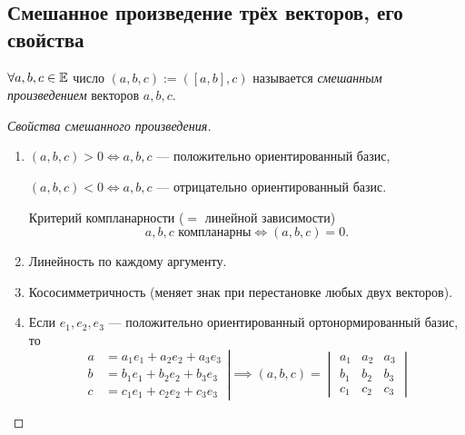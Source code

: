 \subsection{Смешанное произведение трёх векторов, его свойства}

\begin{definition}
    $\forall a, b, c \in \mathbb{E}$ число $(a, b, c) := ([a, b], c)$ называется \textit{смешанным произведением} векторов $a, b, c$.
\end{definition}

\begin{comment}
    Из \hyperref[lec25:t]{теоремы} видно, что $(a, b, c) = \Vol(a, b, c)$.
\end{comment}

\begin{proof}[Свойства смешанного произведения]~
    \begin{enumerate}[nosep]
    \item 
        $(a, b, c) > 0 \iff a, b, c$ --- положительно ориентированный базис,
        
        $(a, b, c) < 0 \iff a, b, c$ --- отрицательно ориентированный базис.

        \medskip
        Критерий компланарности ($= $ линейной зависимости)
        \begin{equation*}
            a, b, c\text{ компланарны} \iff (a, b, c) = 0
        .\end{equation*}

    \item Линейность по каждому аргументу.

    \item Кососимметричность (меняет знак при перестановке любых двух векторов).

    \item Если $e_1, e_2, e_3$ --- положительно ориентированный ортонормированный базис, то
        \begin{equation*}
            \left.\begin{aligned}
                a &= a_1 e_1 + a_2 e_2 + a_3 e_3 \\
                b &= b_1 e_1 + b_2 e_2 + b_3 e_3 \\
                c &= c_1 e_1 + c_2 e_2 + c_3 e_3
            \end{aligned} \right| \implies (a, b, c) = \begin{vmatrix} 
                a_1 & a_2 & a_3 \\
                b_1 & b_2 & b_3 \\
                c_1 & c_2 & c_3
            \end{vmatrix}
        \end{equation*}
    \end{enumerate}
\end{proof}


